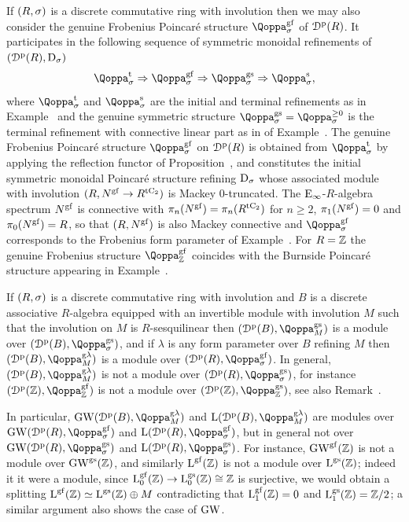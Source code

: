 \begin{example}
\label{example:modules-over-genuine}%
If $(R,\sigma)$ is a discrete commutative ring with involution then we may also consider the genuine Frobenius Poincar\'e structure $\QF^{\g\fr}_\sig$ of ${\mathcal D}^{\mathrm{p}}(R)$. It participates in the following sequence of symmetric monoidal refinements of $({\mathcal D}^{\mathrm{p}}(R),\mathrm{D}_{\sigma})$
\[
\QF^{\tate}_{\sig} \Rightarrow \QF^{\g\fr}_{\sig} \Rightarrow \QF^{\gs}_{\sig} \Rightarrow \QF^{\sym}_{\sig} ,
\]
where $\QF^{\tate}_{\sig}$ and $\QF^{\sym}_{\sig}$ are the initial and terminal refinements as in Example~ and the genuine symmetric structure $\QF^{\gs}_{\sig} = \QF^{\geq 0}_{\sig}$ is the terminal refinement with connective linear part as in of Example~.
The genuine Frobenius Poincaré structure $\QF^{\g\fr}_{\sig}$ on ${\mathcal D}^{\mathrm{p}}(R)$ is obtained from $\QF^{\tate}_{\sig}$ by applying the reflection functor of Proposition~, and 
constitutes the initial symmetric monoidal %
Poincaré structure refining $\mathrm{D}_{\sigma}$ whose associated module with involution $(R,N^{\mathrm{g}\mathrm{f}} \to R^{{\mathrm{t}\mathrm{C_2}}})$ is Mackey 0-truncated. %
The ${\mathrm{E}_{\infty}}$-$R$-algebra spectrum $N^{\mathrm{g}\mathrm{f}}$ is connective with $\pi_n(N^{\mathrm{g}\mathrm{f}}) = \pi_n(R^{{\mathrm{t}\mathrm{C_2}}})$ for $n \geq 2$, $\pi_1(N^{\mathrm{g}\mathrm{f}}) = 0$ and $\pi_0(N^{\mathrm{g}\mathrm{f}}) = R$, so that $(R,N^{\mathrm{g}\mathrm{f}})$ is also Mackey connective and $\QF^{\g\fr}_{\sigma}$ corresponds to the Frobenius form parameter of
Example~.
For $R=\mathbb{Z}$ the genuine Frobenius structure $\QF^{\g\fr}_{\ZZ}$ coincides with the Burnside Poincaré structure %
appearing in Example~.

If $(R,\sigma)$ is a discrete commutative ring with involution and $B$ is a discrete associative $R$-algebra equipped with an invertible module with involution $M$ such that the involution on $M$ is $R$-sesquilinear then $(\Dperf(B),\QF^{\gs}_M)$ is a module over $(\Dperf(B),\QF^{\gs}_{\sig})$, and if $\lambda$ is any form parameter over $B$ refining $M$ then $(\Dperf(B),\QF^{\g\lambda}_M)$ is a module over $(\Dperf(R),\QF^{\g\fr}_{\sig})$. In general, $(\Dperf(B),\QF^{\g\lambda}_M)$ is not a module over $(\Dperf(R),\QF^{\gs}_{\sig})$, for instance $(\Dperf(\ZZ),\QF^{\g\fr}_\ZZ)$ is not a module over $(\Dperf(\ZZ),\QF^\gs_\ZZ)$, see also Remark~.

In particular, $\GW(\Dperf(B),\QF^{\g\lambda}_M)$ and $\L(\Dperf(B),\QF^{\g\lambda}_M)$ are modules over $\GW(\Dperf(R),\QF^{\g\fr}_\sig)$ and $\L(\Dperf(R),\QF^{\g\fr}_\sig)$, but in general not over $\GW(\Dperf(R),\QF^{\gs}_\sig)$ and $\L(\Dperf(R),\QF^{\gs}_\sig)$. For instance, $\operatorname{GW}^{\mathrm{g}\mathrm{f}}(\mathbb{Z})$ is not a module over $\operatorname{GW}^{\mathrm{gs}}(\mathbb{Z})$, and similarly $\operatorname L^{\mathrm{g}\mathrm{f}}(\mathbb{Z})$ is not a module over $\operatorname L^{\mathrm{gs}}(\mathbb{Z})$; indeed it it were a module, since $\operatorname L^{\mathrm{g}\mathrm{f}}_0(\mathbb{Z}) \to \operatorname L^{\mathrm{gs}}_0(\mathbb{Z})\cong \mathbb{Z}$ is surjective, we would obtain a splitting $\operatorname L^{\mathrm{g}\mathrm{f}}(\mathbb{Z}) \simeq \operatorname L^{\mathrm{gs}}(\mathbb{Z}) \oplus M$ contradicting that $\operatorname L^{\mathrm{g}\mathrm{f}}_1(\mathbb{Z}) = 0$ and $\operatorname L^{\mathrm{gs}}_1(\mathbb{Z}) = \mathbb{Z}/2$; a similar argument also shows the case of $\operatorname{GW}$.
\end{example}



